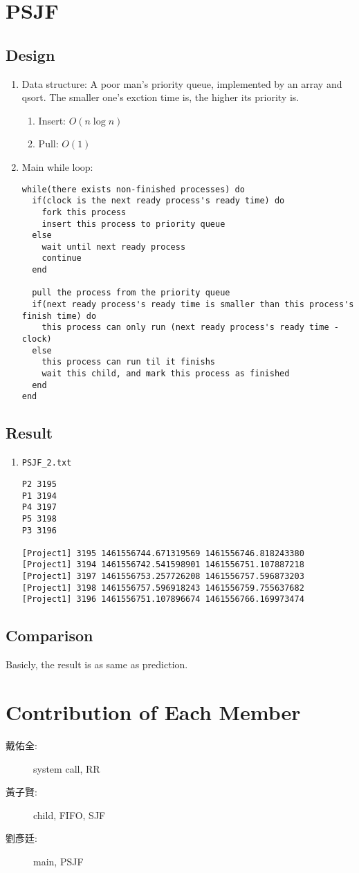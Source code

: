 \documentclass{article}
\begin{document}
\begin{CJK}{UTF8}{bkai}
\section{PSJF}
\subsection{Design}
\begin{enumerate}
\item Data structure: A poor man's priority queue, implemented by an array and
  qsort. The smaller one's exction time is, the higher its priority is.
  \begin{enumerate}
  \item Insert: $O(n \log n)$
  \item Pull: $O(1)$
  \end{enumerate}
\item Main while loop:
\begin{verbatim}
while(there exists non-finished processes) do
  if(clock is the next ready process's ready time) do
    fork this process
    insert this process to priority queue
  else
    wait until next ready process 
    continue
  end

  pull the process from the priority queue
  if(next ready process's ready time is smaller than this process's finish time) do
    this process can only run (next ready process's ready time - clock)
  else
    this process can run til it finishs
    wait this child, and mark this process as finished
  end
end
\end{verbatim}
\end{enumerate}

\subsection{Result}
\begin{enumerate}
\item \texttt{PSJF\_2.txt}
\begin{verbatim}
P2 3195
P1 3194
P4 3197
P5 3198
P3 3196

[Project1] 3195 1461556744.671319569 1461556746.818243380
[Project1] 3194 1461556742.541598901 1461556751.107887218
[Project1] 3197 1461556753.257726208 1461556757.596873203
[Project1] 3198 1461556757.596918243 1461556759.755637682
[Project1] 3196 1461556751.107896674 1461556766.169973474
\end{verbatim}
\end{enumerate}

\subsection{Comparison}
Basicly, the result is as same as prediction.

\section{Contribution of Each Member}
\begin{description}
\item[戴佑全:] system call, RR
\item[黃子賢:] child, FIFO, SJF
\item[劉彥廷:] main, PSJF
\end{description}

\end{CJK}
\end{document}
